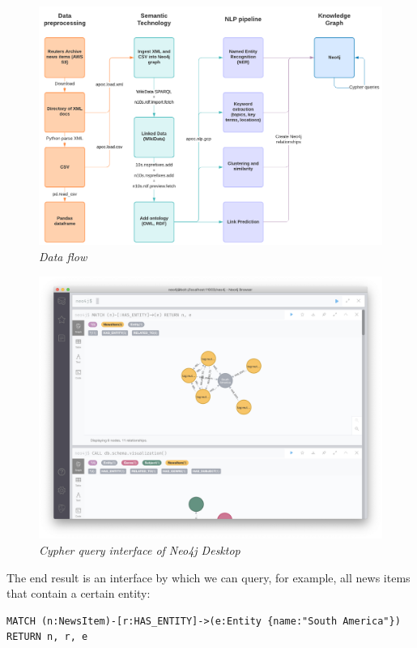 \documentclass[11pt]{article}
\begin{document}
\begin{figure}
\centerline{\includegraphics[scale=0.2]{data-pipeline}}
\caption{\textit{Data flow}}
\end{figure}

\begin{figure}
\centerline{\includegraphics[scale=0.2]{neo4j-cypher-interface}}
\caption{\textit{Cypher query interface of Neo4j Desktop}}
\end{figure}

The end result is an interface by which we can query, for example, all news items that contain a certain entity:

\begin{verbatim}
MATCH (n:NewsItem)-[r:HAS_ENTITY]->(e:Entity {name:"South America"})
RETURN n, r, e
\end{verbatim}
\end{document}
